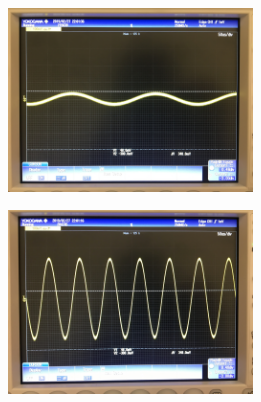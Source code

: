 \documentclass[journal]{IEEEtran}
\begin{document}
\begingroup
    \centering
    \includegraphics[width=245]{images/lab5_5.jpg}
    \label{fig:HPF}
\endgroup

\begingroup
    \centering
    \includegraphics[width=245]{images/lab5_4.jpg}
    \label{fig:HPF}
\endgroup
\end{document}
